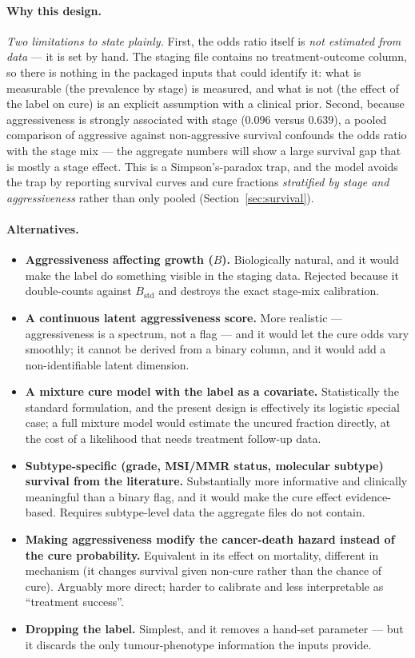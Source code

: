 \documentclass[12pt,a4paper]{article}
\newcommand{\why}[1]{\paragraph{Why this design.} #1}
\newcommand{\alt}[1]{\paragraph{Alternatives.} #1}
\begin{document}
\why{\emph{Two limitations to state plainly.}
First, the odds ratio itself is \emph{not estimated from data} --- it is set by hand. The staging file
contains no treatment-outcome column, so there is nothing in the packaged inputs that could identify it:
what is measurable (the prevalence by stage) is measured, and what is not (the effect of the label on
cure) is an explicit assumption with a clinical prior.
Second, because aggressiveness is strongly associated with stage ($0.096$ versus $0.639$), a pooled
comparison of aggressive against non-aggressive survival confounds the odds ratio with the stage mix ---
the aggregate numbers will show a large survival gap that is mostly a stage effect. This is a
Simpson's-paradox trap, and the model avoids the trap by reporting survival curves and cure fractions
\emph{stratified by stage and aggressiveness} rather than only pooled (Section~\ref{sec:survival}).}

\alt{\begin{itemize}[nosep]
  \item \textbf{Aggressiveness affecting growth ($B$).} Biologically natural, and it would make the label
        do something visible in the staging data. Rejected because it double-counts against
        $B_{\text{std}}$ and destroys the exact stage-mix calibration.
  \item \textbf{A continuous latent aggressiveness score.} More realistic --- aggressiveness is a
        spectrum, not a flag --- and it would let the cure odds vary smoothly; it cannot be derived from a
        binary column, and it would add a non-identifiable latent dimension.
  \item \textbf{A mixture cure model with the label as a covariate.} Statistically the standard
        formulation, and the present design is effectively its logistic special case; a full mixture model
        would estimate the uncured fraction directly, at the cost of a likelihood that needs treatment
        follow-up data.
  \item \textbf{Subtype-specific (grade, MSI/MMR status, molecular subtype) survival from the literature.}
        Substantially more informative and clinically meaningful than a binary flag, and it would make the
        cure effect evidence-based. Requires subtype-level data the aggregate files do not contain.
  \item \textbf{Making aggressiveness modify the cancer-death hazard instead of the cure probability.}
        Equivalent in its effect on mortality, different in mechanism (it changes survival given
        non-cure rather than the chance of cure). Arguably more direct; harder to calibrate and less
        interpretable as ``treatment success''.
  \item \textbf{Dropping the label.} Simplest, and it removes a hand-set parameter --- but it discards the
        only tumour-phenotype information the inputs provide.
\end{itemize}}
\end{document}
